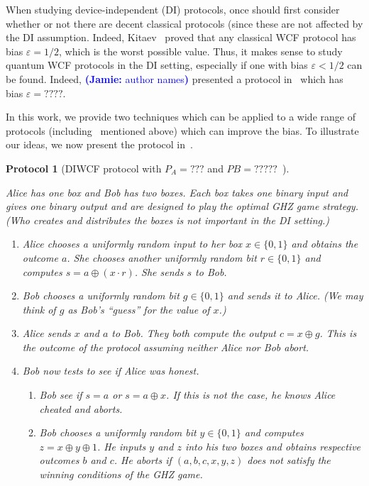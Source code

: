 \documentclass[11pt]{article}
\newtheorem{protocol}{Protocol}
\newcommand{\eps}{\varepsilon}
\newcommand{\Jnote}[1]{\textcolor{blue}{ {\textbf{(Jamie: }#1\textbf{) }}}}
\begin{document}
When studying device-independent (DI) protocols, once should first consider whether or not there are decent classical protocols (since these are not affected by the DI assumption. 
Indeed, Kitaev~\cite{Kit02} proved that any classical WCF protocol has bias $\eps = 1/2$, which is the worst possible value. 
Thus, it makes sense to study quantum WCF protocols in the DI setting, especially if one with bias $\eps < 1/2$ can be found. 
Indeed, \Jnote{author names} presented a protocol in~\cite{????} which has bias $\eps = ????$. 

In this work, we provide two techniques which can be applied to a wide range of protocols (including~\cite{????} mentioned above) which can improve the bias. 
To illustrate our ideas, we now present the protocol in~\cite{????}. 


\begin{protocol}[DIWCF protocol with $P_A = ???$ and $PB = ?????$~\cite{????}] \label{alg:SCForiginal}  
   
Alice has one box and Bob has two boxes. 
Each box takes one binary input and gives one binary output and are designed to play the optimal GHZ game strategy. 
(Who creates and distributes the boxes is not important in the DI setting.) 
\begin{enumerate}
\item 
Alice chooses a uniformly random input to her box $x \in \{ 0, 1 \}$ and obtains the outcome $a$. 
She chooses another uniformly random bit $r \in \{ 0, 1 \}$ and computes $s = a \oplus (x \cdot r)$. 
She sends $s$ to Bob. 
\item 
Bob chooses a uniformly random bit $g \in \{ 0, 1 \}$ and sends it to Alice. 
(We may think of $g$ as Bob's ``guess'' for the value of $x$.) 
\item 
Alice sends $x$ and $a$ to Bob. 
They both compute the output $c = x \oplus g$. 
This is the outcome of the protocol assuming neither Alice nor Bob abort. 
\item 
Bob now tests to see if Alice was honest. 
\begin{enumerate} 
\item[\textup{Test 1}:] Bob see if $s = a$ or $s = a \oplus x$. 
If this is not the case, he knows Alice cheated and aborts. 
\item[\textup{Test 2}:] Bob chooses a uniformly random bit 
$y \in \{ 0, 1 \}$ and computes $z =  x \oplus y \oplus 1$. 
He inputs $y$ and $z$ into his two boxes and obtains respective outcomes $b$ and $c$. 
He aborts if $(a,b,c,x,y,z)$ does not satisfy the winning conditions of the GHZ game. 
\end{enumerate} 
\end{enumerate} 
\end{protocol} 
 
\end{document}
